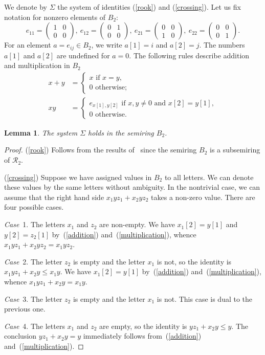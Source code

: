 \documentclass[12pt,draft]{amsart}
\newtheorem{lemma}{Lemma}
\begin{document}
We denote by $\Sigma$ the system of identities (\ref{rook}) and (\ref{crossing}). Let us fix notation for nonzero elements of $B_2$:
$$e_{11}=\begin{pmatrix}
1&0\\
0&0
\end{pmatrix},\ 
e_{12}=\begin{pmatrix}
0&1\\
0&0
\end{pmatrix},\ 
e_{21}=\begin{pmatrix}
0&0\\
1&0
\end{pmatrix},\ 
e_{22}=\begin{pmatrix}
0&0\\
0&1
\end{pmatrix}.$$
For an element $a=e_{ij}\in B_2$, we write $a[1]=i$ and $a[2]=j$. The numbers $a[1]$ and $a[2]$ are undefined for $a=0$. The following rules describe addition and multiplication in $B_2$
\begin{align}
\label{addition}
x+y&=\begin{cases}
x\text{ if }x=y,\\
0\text{ otherwise;}
\end{cases}\\
\label{multiplication}
xy&=\begin{cases}
e_{x[1],y[2]}\text{ if }x,y\neq0\text{ and }x[2]=y[1],\\
0\text{ otherwise.}
\end{cases}
\end{align}

\begin{lemma}
\label{sigma} The system $\Sigma$ holds in the semiring $B_2$.
\end{lemma}
\begin{proof}
(\ref{rook}) Follows from the results of~\cite{Garvackii-71} since the semiring $B_2$ is a subsemiring of $\mathcal R_2$.

(\ref{crossing}) Suppose we have assigned values in $B_2$ to all letters. We can denote these values by the same letters without ambiguity. In the nontrivial case, we can assume that the right hand side $x_1yz_1+x_2yz_2$ takes a non-zero value. There are four possible cases.

\emph{Case}~1. The letters $x_1$ and $z_2$ are non-empty. We have $x_1[2]=y[1]$ and $y[2]=z_2[1]$ by~(\ref{addition}) and~(\ref{multiplication}), whence $x_1yz_1+x_2yz_2=x_1yz_2$.

\emph{Case}~2. The letter $z_2$ is empty and the letter $x_1$ is not, so the identity is $x_1yz_1+x_2y\le x_1y$. We have $x_1[2]=y[1]$ by~(\ref{addition}) and~(\ref{multiplication}), whence $x_1yz_1+x_2y=x_1y$.

\emph{Case}~3. The letter $z_2$ is empty and the letter $x_1$ is not. This case is dual to the previous one.

\emph{Case}~4. The letters $x_1$ and $z_2$ are empty, so the identity is $yz_1+x_2y\le y$. The conclusion $yz_1+x_2y=y$ immediately follows from~(\ref{addition}) and~(\ref{multiplication}).
\end{proof}
\end{document}
